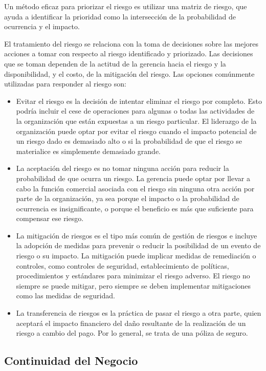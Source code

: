  Un método eficaz para priorizar el riesgo es utilizar una matriz de riesgo, que ayuda a identificar la prioridad como la intersección de la probabilidad de ocurrencia y el impacto.

El tratamiento del riesgo se relaciona con la toma de decisiones sobre las mejores acciones a tomar con respecto al riesgo identificado y priorizado. Las decisiones que se toman dependen de la actitud de la gerencia hacia el riesgo y la disponibilidad, y el costo, de la mitigación del riesgo. Las opciones comúnmente utilizadas para responder al riesgo son:

\begin{itemize}
    \item Evitar el riesgo es la decisión de intentar eliminar el riesgo por completo. Esto podría incluir el cese de operaciones para algunas o todas las actividades de la organización que están expuestas a un riesgo particular. El liderazgo de la organización puede optar por evitar el riesgo cuando el impacto potencial de un riesgo dado es demasiado alto o si la probabilidad de que el riesgo se materialice es simplemente demasiado grande.
    \item La aceptación del riesgo es no tomar ninguna acción para reducir la probabilidad de que ocurra un riesgo. La gerencia puede optar por llevar a cabo la función comercial asociada con el riesgo sin ninguna otra acción por parte de la organización, ya sea porque el impacto o la probabilidad de ocurrencia es insignificante, o porque el beneficio es más que suficiente para compensar ese riesgo.
    \item La mitigación de riesgos es el tipo más común de gestión de riesgos e incluye la adopción de medidas para prevenir o reducir la posibilidad de un evento de riesgo o su impacto. La mitigación puede implicar medidas de remediación o controles, como controles de seguridad, establecimiento de políticas, procedimientos y estándares para minimizar el riesgo adverso. El riesgo no siempre se puede mitigar, pero siempre se deben implementar mitigaciones como las medidas de seguridad.
    \item La transferencia de riesgos es la práctica de pasar el riesgo a otra parte, quien aceptará el impacto financiero del daño resultante de la realización de un riesgo a cambio del pago. Por lo general, se trata de una póliza de seguro.
 \end{itemize}



\subsection{Continuidad del Negocio}


